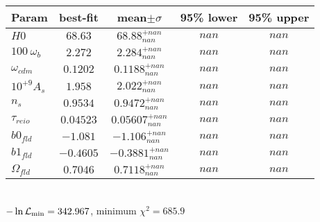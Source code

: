 \begin{tabular}{|l|c|c|c|c|} 
 \hline 
Param & best-fit & mean$\pm\sigma$ & 95\% lower & 95\% upper \\ \hline 
$H0$ &$68.63$ & $68.88_{nan}^{+nan}$ & $nan$ & $nan$ \\ 
$100~\omega_{b }$ &$2.272$ & $2.284_{nan}^{+nan}$ & $nan$ & $nan$ \\ 
$\omega_{cdm }$ &$0.1202$ & $0.1188_{nan}^{+nan}$ & $nan$ & $nan$ \\ 
$10^{+9}A_{s }$ &$1.958$ & $2.022_{nan}^{+nan}$ & $nan$ & $nan$ \\ 
$n_{s }$ &$0.9534$ & $0.9472_{nan}^{+nan}$ & $nan$ & $nan$ \\ 
$\tau_{reio }$ &$0.04523$ & $0.05607_{nan}^{+nan}$ & $nan$ & $nan$ \\ 
$b0_{fld }$ &$-1.081$ & $-1.106_{nan}^{+nan}$ & $nan$ & $nan$ \\ 
$b1_{fld }$ &$-0.4605$ & $-0.3881_{nan}^{+nan}$ & $nan$ & $nan$ \\ 
$\Omega_{fld }$ &$0.7046$ & $0.7118_{nan}^{+nan}$ & $nan$ & $nan$ \\ 
\hline 
 \end{tabular} \\ 
$-\ln{\cal L}_\mathrm{min} =342.967$, minimum $\chi^2=685.9$ \\ 
